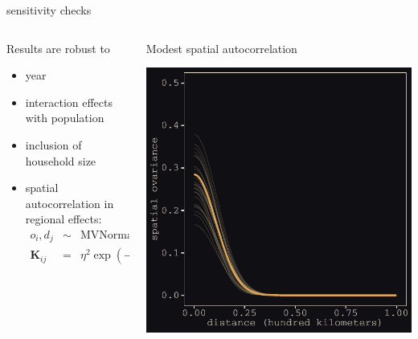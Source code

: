 \documentclass{beamer}
\begin{document}
\begin{frame}{sensitivity checks}
			\begin{columns}
		\begin{column}{0.5\textwidth}
				Results are \alert{robust} to
				\begin{itemize}
					\item year\pause
					\item interaction effects with population \pause
				  \item inclusion of household size \pause
				  \item spatial autocorrelation in regional effects:
					\begin{eqnarray*}
					  o_{i}, d_{j}& \sim &\text{MVNormal}(0, \mathbf{K})\\
					  \mathbf{K}_{ij} & = & \eta^{2}\exp(-\rho^{2}\mathbf{D}_{ij})
					\end{eqnarray*}
					\pause
				  \end{itemize}
		\end{column}
		\begin{column}{0.5\textwidth}
			\alert{Modest} spatial autocorrelation
			\begin{center}
				\includegraphics[width=\textwidth]{../../fig/spatial_autocorrelation}
			\end{center}
		\end{column}
	\end{columns}
\end{frame}
\end{document}
